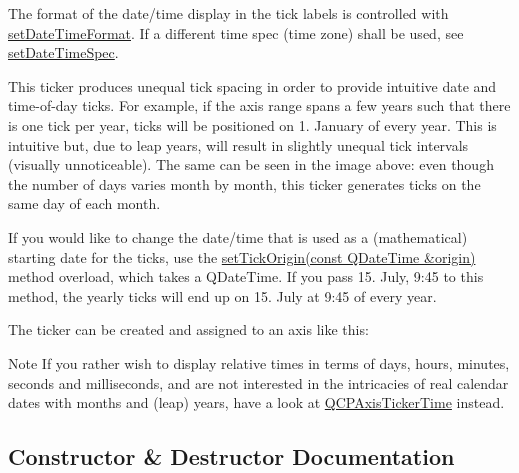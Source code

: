 The format of the date/time display in the tick labels is controlled with \hyperlink{class_q_c_p_axis_ticker_date_time_ad52660a82f688395468674d555f6a86b}{set\+Date\+Time\+Format}. If a different time spec (time zone) shall be used, see \hyperlink{class_q_c_p_axis_ticker_date_time_afbd987c7197e42ab61e67fb1c38abebc}{set\+Date\+Time\+Spec}.

This ticker produces unequal tick spacing in order to provide intuitive date and time-\/of-\/day ticks. For example, if the axis range spans a few years such that there is one tick per year, ticks will be positioned on 1. January of every year. This is intuitive but, due to leap years, will result in slightly unequal tick intervals (visually unnoticeable). The same can be seen in the image above\+: even though the number of days varies month by month, this ticker generates ticks on the same day of each month.

If you would like to change the date/time that is used as a (mathematical) starting date for the ticks, use the \hyperlink{class_q_c_p_axis_ticker_date_time_a2ea905872b8171847a49a5e093fb0c48}{set\+Tick\+Origin(const Q\+Date\+Time \&origin)} method overload, which takes a Q\+Date\+Time. If you pass 15. July, 9\+:45 to this method, the yearly ticks will end up on 15. July at 9\+:45 of every year.

The ticker can be created and assigned to an axis like this\+: 
\begin{DoxyCodeInclude}
\end{DoxyCodeInclude}
 \begin{DoxyNote}{Note}
If you rather wish to display relative times in terms of days, hours, minutes, seconds and milliseconds, and are not interested in the intricacies of real calendar dates with months and (leap) years, have a look at \hyperlink{class_q_c_p_axis_ticker_time}{Q\+C\+P\+Axis\+Ticker\+Time} instead. 
\end{DoxyNote}


\subsection{Constructor \& Destructor Documentation}
\mbox{\label{class_q_c_p_axis_ticker_date_time_a84cc5c6bbc7c99c1f9bd4b3a392e1b9d}} 
